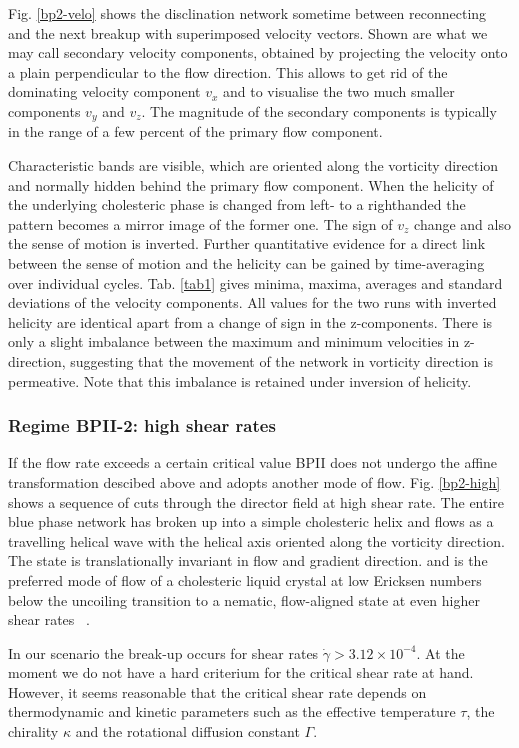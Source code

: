 \documentclass[aps,pre,reprint,superscriptaddress, twocolumn]{revtex4}
\newcommand{\e}[1]{\times10^{#1}}
\newcommand{\gd}{\dot{\gamma}}
\begin{document}
Fig. \ref{bp2-velo} shows the disclination network sometime between reconnecting 
and the next breakup with superimposed velocity vectors.
Shown are what we may call secondary velocity components, obtained by projecting the
velocity onto a plain perpendicular to the flow direction.
This allows to get rid of the dominating velocity component $v_x$ and to
visualise the two much smaller components $v_y$ and $v_z$.
The magnitude of the secondary components is typically in the range of a 
few percent of the primary flow component.

Characteristic bands are visible, which are oriented along the vorticity direction and
normally hidden behind the primary flow component.
When the helicity of the underlying cholesteric phase is changed from left- to a 
righthanded the pattern becomes a mirror image of the former one. The sign of 
$v_z$ change and also the sense of motion is inverted.
Further quantitative evidence for a direct link between the sense of motion 
and the helicity can be gained by time-averaging over individual cycles.
Tab. \ref{tab1} gives minima, maxima, averages and standard deviations 
of the velocity components.
All values for the two runs with inverted helicity are identical apart 
from a change of sign in the z-components.
There is only a slight imbalance between the maximum and minimum velocities 
in z-direction, suggesting that the movement of the network in vorticity 
direction is permeative. Note that this imbalance is retained under inversion of
helicity.

\subsubsection{Regime BPII-2: high shear rates}

If the flow rate exceeds a certain critical value BPII does not undergo the 
affine transformation descibed above and adopts another mode of flow. 
Fig. \ref{bp2-high} shows a sequence of cuts through the director 
field at high shear rate. The entire blue phase network has broken up 
into a simple cholesteric helix and flows as a travelling 
helical wave with the helical axis oriented along the vorticity direction.
The state is translationally invariant in flow and gradient direction.
and is the preferred mode of flow of a cholesteric 
liquid crystal at low Ericksen numbers below the uncoiling transition 
to a nematic, flow-aligned state at even higher shear rates ~\cite{Rey:1996a, Rey:1996b}.

In our scenario the break-up occurs for shear rates $\gd>3.12\e{-4}$.
At the moment we do not have a hard criterium for the critical
shear rate at hand. However, it seems reasonable that the critical shear rate 
depends on thermodynamic and kinetic parameters such as the effective 
temperature $\tau$, the chirality $\kappa$ and the rotational diffusion 
constant $\Gamma$.
\end{document}
